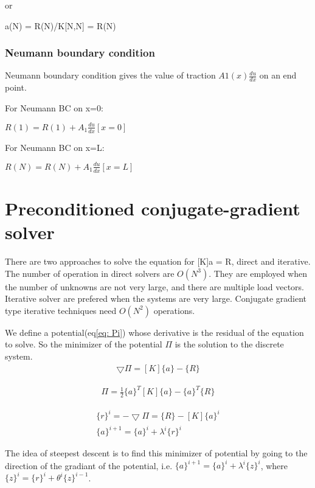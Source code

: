 \documentclass[paper=a4, fontsize=11pt]{article} %
\begin{document}
or
 
a(N) = R(N)/K[N,N] = R(N) 

\subsubsection{Neumann boundary condition}
Neumann boundary condition gives the value of traction $A1(x)\frac{du}{dx}$ on an end point.

For Neumann BC on x=0:

 $R(1) = R(1) + A_1 \frac{du}{dx}[x=0] $


For Neumann BC on x=L:

 $R(N)=R(N)+ A_1 \frac{du}{dx}[x=L] $
\section{Preconditioned conjugate-gradient solver}
There are two approaches to solve the equation for [K]{a} = {R}, direct and iterative. The number of operation in direct solvers are  $O(N^3)$. They are employed when the number of unknowns are not very large, and there are multiple load vectors. Iterative solver are prefered when the systems are very large. Conjugate gradient type iterative techniques need $O(N^2)$ operations. 

We define a potential(eq\ref{eq: Pi}) whose derivative is the residual of the equation to solve. So the minimizer of the potential $\Pi$ is the solution to the discrete system. 
\begin{eqnarray}
\bigtriangledown \Pi = [K]\{a\} - \{R\}
\end{eqnarray}

\begin{eqnarray}
\label{eq: Pi}
\Pi = \frac{1}{2} \{a\}^T [K] \{a\} - \{a\}^T\{R\}
\end{eqnarray}

\begin{eqnarray}
\label{eq: residual}
\{r\}^i = - \bigtriangledown \Pi = \{R\} - [K] \{a\}^i \nonumber\\
\{a\}^{i+1} = \{a\}^i + \lambda^i \{r\}^i
\end{eqnarray}

The idea of steepest descent is to find this minimizer of potential by going to the direction of the gradiant of the potential, i.e. $\{a\} ^{i+1} = \{a\} ^i + \lambda ^i \{z\} ^i $, where $\{z\}^i = \{r\}^i + \theta ^i\{z\}^{i-1}$.
\end{document}
